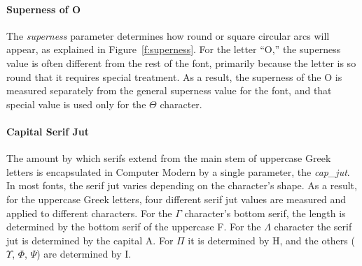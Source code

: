 \paragraph{Superness of O} The \emph{superness} parameter determines how round
or square circular arcs will appear, as explained in Figure~\ref{f:superness}.
For the letter ``O,'' the superness value is often different from the rest of
the font, primarily because the letter is so round that it requires special
treatment. As a result, the superness of the O is measured separately from the
general superness value for the font, and that special value is used only for
the $\Theta$ character.

\paragraph{Capital Serif Jut} The amount by which serifs extend from the main
stem of uppercase Greek letters is encapsulated in Computer Modern by a single
parameter, the \emph{cap\_jut}. In most fonts, the serif jut varies depending on
the character's shape. As a result, for the uppercase Greek letters, four
different serif jut values are measured and applied to different characters. For
the $\Gamma$ character's bottom serif, the length is determined by the bottom
serif of the uppercase F. For the $\Lambda$ character the serif jut is
determined by the capital A. For $\Pi$ it is determined by H, and the others
($\Upsilon$, $\Phi$, $\Psi$) are determined by I.
